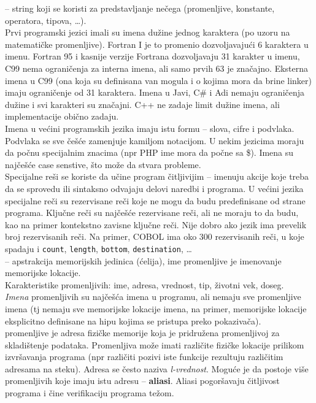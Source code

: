 \documentclass[../main.tex]{subfiles}
\begin{document}
 -- string koji se koristi za predstavljanje nečega (promenljive, konstante, operatora, tipova, \ldots). \\
Prvi programski jezici imali su imena dužine jednog karaktera (po uzoru na matematičke promenljive). Fortran I je to promenio dozvoljavajući 6 karaktera u imenu. Fortran 95 i kasnije verzije Fortrana dozvoljavaju 31 karakter u imenu, C99 nema ograničenja za interna imena, ali samo prvih 63 je značajno. Eksterna imena u C99 (ona koja su definisana van mogula i o kojima mora da brine linker) imaju ograničenje od 31 karaktera. Imena u Javi, C\# i Adi nemaju ograničenja dužine i svi karakteri su značajni. C++ ne zadaje limit dužine imena, ali implementacije obično zadaju.
\\
Imena u većini programskih jezika imaju istu formu -- slova, cifre i podvlaka. Podvlaka se sve češće zamenjuje kamiljom \break notacijom. U nekim jezicima moraju da počnu specijalnim znacima (npr PHP ime mora da počne sa \$). Imena su najčešće case senstive, što može da stvara probleme.
\\
Specijalne reši se koriste da učine program čitljivijim -- imenuju akcije koje treba da se sprovedu ili sintaksno odvajaju delovi naredbi i programa. U većini jezika specijalne reči su rezervisane reči koje ne mogu da budu predefinisane od strane programa. Ključne reči su najčešće rezervisane reči, ali ne moraju to da budu, kao na primer kontekstno zavisne ključne reči. Nije dobro ako jezik ima prevelik broj rezervisanih reči. Na primer, COBOL ima oko 300 rezervisanih reči, u koje spadaju i \texttt{count}, \texttt{length}, \texttt{bottom}, \texttt{destination}, \ldots
\\
 -- apstrakcija memorijskih jedinica (ćelija), ime promenljive je imenovanje memorijske lokacije.
\\
Karakteristike promenljivih: ime, adresa, vrednost, tip, životni vek, doseg. 
\\
{\it Imena} promenljivih su najčešća imena u programu, ali nemaju sve promenljive imena (tj nemaju sve memorijske lokacije imena, na primer, memorijske lokacije eksplicitno definisane na hipu kojima se pristupa preko pokazivača). 
\\
 promenljive je adresa fizičke memorije koja je pridružena promenljivoj za skladištenje podataka. Promenljiva može imati različite fizičke lokacije prilikom izvršavanja programa (npr različiti pozivi iste funkcije rezultuju različitim adresama na steku). Adresa se često naziva {\it l-vrednost}. Moguće je da postoje više promenljivih koje imaju istu adresu -- {\bf aliasi}. Aliasi pogoršavaju čitljivost programa i čine verifikaciju programa težom.
\end{document}
